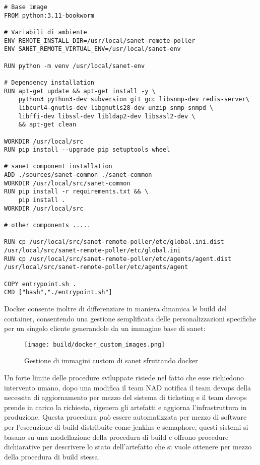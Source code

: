 \begin{lstlisting}[]
# Base image
FROM python:3.11-bookworm

# Variabili di ambiente
ENV REMOTE_INSTALL_DIR=/usr/local/sanet-remote-poller
ENV SANET_REMOTE_VIRTUAL_ENV=/usr/local/sanet-env

RUN python -m venv /usr/local/sanet-env

# Dependency installation
RUN apt-get update && apt-get install -y \
    python3 python3-dev subversion git gcc libsnmp-dev redis-server\
    libcurl4-gnutls-dev libgnutls28-dev unzip snmp snmpd \
    libffi-dev libssl-dev libldap2-dev libsasl2-dev \
    && apt-get clean

WORKDIR /usr/local/src
RUN pip install --upgrade pip setuptools wheel

# sanet component installation
ADD ./sources/sanet-common ./sanet-common
WORKDIR /usr/local/src/sanet-common
RUN pip install -r requirements.txt && \
    pip install .
WORKDIR /usr/local/src

# other components .....

RUN cp /usr/local/src/sanet-remote-poller/etc/global.ini.dist /usr/local/src/sanet-remote-poller/etc/global.ini
RUN cp /usr/local/src/sanet-remote-poller/etc/agents/agent.dist /usr/local/src/sanet-remote-poller/etc/agents/agent

COPY entrypoint.sh .
CMD ["bash","./entrypoint.sh"]
\end{lstlisting}

Docker consente inoltre di differenziare in maniera dinamica le build del container, consentendo una gestione semplificata delle personalizzazioni specifiche per un singolo cliente generandole da un immagine base di sanet:

\begin{figure}[H]
    \centering
    \texttt{[image: build/docker\_custom\_images.png]}
    \caption{Gestione di immagini custom di sanet sfruttando docker}
    \label{fig:docker_custom_images}
\end{figure}


Un forte limite delle procedure sviluppate risiede nel fatto che esse richiedono intervento umano, dopo una modifica il team NAD notifica il team devops della necessita di aggiornamento per mezzo del sistema di ticketing e il team devops prende in carico la richiesta, rigenera gli artefatti e aggiorna l'infrastruttura in produzione.
Questa procedura può essere automatizzata per mezzo di software per l'esecuzione di build distribuite come jenkins\cite{jenkins} e semaphore, questi sistemi si basano su una modellazione della procedura di build e offrono procedure dichiarative per descrivere lo stato dell'artefatto che si vuole ottenere per mezzo della procedura di build stessa.

